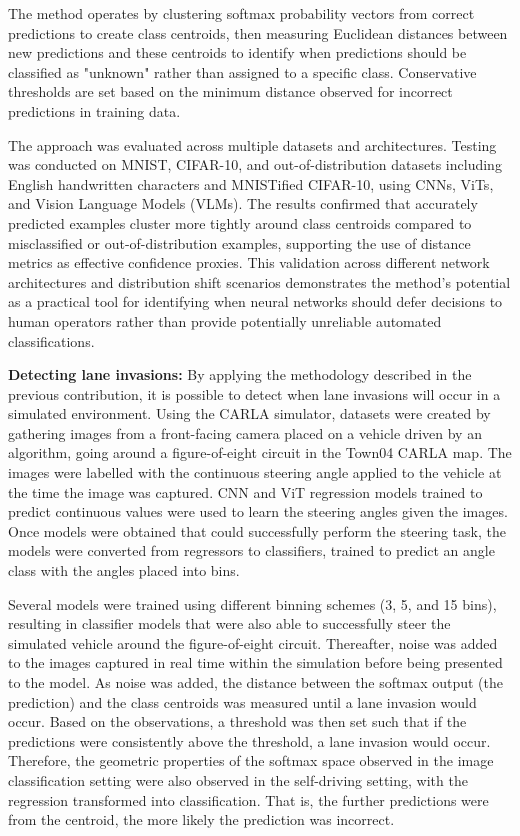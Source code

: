 The method operates by clustering softmax probability vectors from correct predictions to create class centroids, then measuring Euclidean distances between new predictions and these centroids to identify when predictions should be classified as "unknown" rather than assigned to a specific class. Conservative thresholds are set based on the minimum distance observed for incorrect predictions in training data.

The approach was evaluated across multiple datasets and architectures. Testing was conducted on MNIST, CIFAR-10, and out-of-distribution datasets including English handwritten characters and MNISTified CIFAR-10, using CNNs, ViTs, and Vision Language Models (VLMs). The results confirmed that accurately predicted examples cluster more tightly around class centroids compared to misclassified or out-of-distribution examples, supporting the use of distance metrics as effective confidence proxies. This validation across different network architectures and distribution shift scenarios demonstrates the method's potential as a practical tool for identifying when neural networks should defer decisions to human operators rather than provide potentially unreliable automated classifications.

\textbf{Detecting lane invasions:} By applying the methodology described in the previous contribution, it is possible to detect when lane invasions will occur in a simulated environment. Using the CARLA simulator, datasets were created by gathering images from a front-facing camera placed on a vehicle driven by an algorithm, going around a figure-of-eight circuit in the Town04 CARLA map. The images were labelled with the continuous steering angle applied to the vehicle at the time the image was captured. CNN and ViT regression models trained to predict continuous values were used to learn the steering angles given the images. Once models were obtained that could successfully perform the steering task, the models were converted from regressors to classifiers, trained to predict an angle class with the angles placed into bins.

Several models were trained using different binning schemes (3, 5, and 15 bins), resulting in classifier models that were also able to successfully steer the simulated vehicle around the figure-of-eight circuit. Thereafter, noise was added to the images captured in real time within the simulation before being presented to the model. As noise was added, the distance between the softmax output (the prediction) and the class centroids was measured until a lane invasion would occur. Based on the observations, a threshold was then set such that if the predictions were consistently above the threshold, a lane invasion would occur. Therefore, the geometric properties of the softmax space observed in the image classification setting were also observed in the self-driving setting, with the regression transformed into classification. That is, the further predictions were from the centroid, the more likely the prediction was incorrect.

